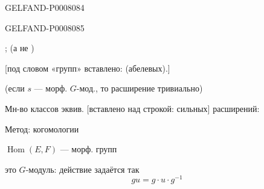 \begin{GelfandAdjacentEvidence}{GELFAND-P000808}{4}


\end{GelfandAdjacentEvidence}
\begin{GelfandAdjacentEvidence}{GELFAND-P000808}{5}


;
 (а не )
\end{GelfandAdjacentEvidence}


[под словом «групп» вставлено: (абелевых).]

(если \(s\) --- морф. \(G\)-мод., то расширение тривиально)

Мн-во классов эквив. [вставлено над строкой: сильных] расширений:

Метод: когомологии

\(\operatorname{Hom}(E,F)\) --- морф. групп

это \(G\)-модуль: действие задаётся так
\[
gu=g\cdot u\cdot g^{-1}
\]


